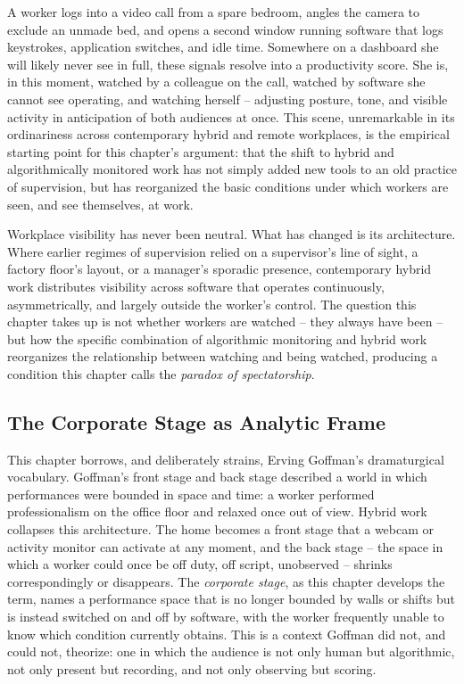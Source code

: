 \documentclass[11pt]{article}
\begin{document}
A worker logs into a video call from a spare bedroom, angles the
camera to exclude an unmade bed, and opens a second window running
software that logs keystrokes, application switches, and idle time.
Somewhere on a dashboard she will likely never see in full, these
signals resolve into a productivity score. She is, in this moment,
watched by a colleague on the call, watched by software she cannot
see operating, and watching herself -- adjusting posture, tone, and
visible activity in anticipation of both audiences at once. This
scene, unremarkable in its ordinariness across contemporary hybrid
and remote workplaces, is the empirical starting point for this
chapter's argument: that the shift to hybrid and algorithmically
monitored work has not simply added new tools to an old practice of
supervision, but has reorganized the basic conditions under which
workers are seen, and see themselves, at work.

Workplace visibility has never been neutral. What has changed is its
architecture. Where earlier regimes of supervision relied on a
supervisor's line of sight, a factory floor's layout, or a manager's
sporadic presence, contemporary hybrid work distributes visibility
across software that operates continuously, asymmetrically, and
largely outside the worker's control. The question this chapter
takes up is not whether workers are watched -- they always have
been -- but how the specific combination of algorithmic monitoring
and hybrid work reorganizes the relationship between watching and
being watched, producing a condition this chapter calls the
\textit{paradox of spectatorship}.

\subsection{The Corporate Stage as Analytic Frame}

This chapter borrows, and deliberately strains, Erving Goffman's
dramaturgical vocabulary. Goffman's front stage and back stage
described a world in which performances were bounded in space and
time: a worker performed professionalism on the office floor and
relaxed once out of view. Hybrid work collapses this architecture.
The home becomes a front stage that a webcam or activity monitor can
activate at any moment, and the back stage -- the space in which a
worker could once be off duty, off script, unobserved -- shrinks
correspondingly or disappears. The \textit{corporate stage}, as this
chapter develops the term, names a performance space that is no
longer bounded by walls or shifts but is instead switched on and off
by software, with the worker frequently unable to know which
condition currently obtains. This is a context Goffman did not, and
could not, theorize: one in which the audience is not only human but
algorithmic, not only present but recording, and not only observing
but scoring.
\end{document}
